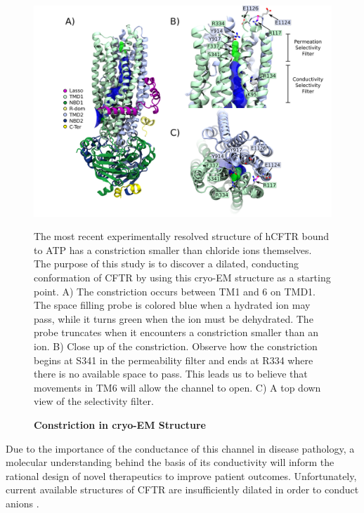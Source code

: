 \begin{figure}
	\begin{center}
		\includegraphics[width=1\textwidth]{figures/opening/overall_hole_constricted.pdf}
	\end{center}
	\captionsetup{singlelinecheck = false, justification=raggedright}
	\caption[Constriction in cryo-EM Structure] {\textbf{Constriction in cryo-EM Structure}}{The most recent experimentally resolved structure of hCFTR bound to ATP has a constriction smaller than chloride ions themselves\cite{zhang2018}. The purpose of this study is to discover a dilated, conducting conformation of CFTR by using this cryo-EM structure as a starting point. A) The constriction occurs between TM1 and 6 on TMD1. The space filling probe is colored blue when a hydrated ion may pass, while it turns green when the ion must be dehydrated. The probe truncates when it encounters a constriction smaller than an ion.  B) Close up of the constriction. Observe how the constriction begins at S341 in the permeability filter and ends at R334 where there is no available space to pass. This leads us to believe that movements in TM6 will allow the channel to open. C) A top down view of the selectivity filter.}
	\label{constricted_sel_filter}
\end{figure}

Due to the importance of the conductance of this channel in disease pathology, a molecular understanding behind the basis of its conductivity will inform the rational design of novel therapeutics to improve patient outcomes. Unfortunately, current available structures of CFTR are insufficiently dilated in order to conduct anions \cite{zhang2018}.


